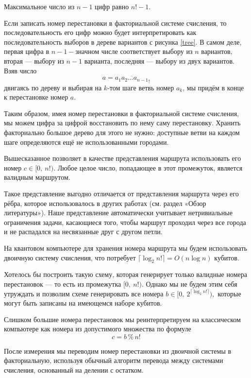 Максимальное число из $n-1$ цифр равно $n!-1$. 
 
Если записать номер перестановки в факториальной системе счисления, то последовательность его цифр можно будет интерпретировать как последовательность выборов в дереве вариантов с рисунка \ref{tree}. 
В самом деле, первая цифра в $n{-}1{-}$значном числе соответствует выбору из $n$ вариантов, вторая --- выбору из $n-1$ варианта, последняя --- выбору из двух вариантов. 
Взяв число 
$$a = \overline{a_1 a_2 \dots a_{n-1}}_!$$ 
двигаясь по дереву и выбирая на $k$-том шаге ветвь номер $a_k$, мы придём в конце к перестановке номер $a$.

Таким образом, имея номер перестановки в факториальной системе счисления, мы можем цифра за цифрой восстановить по нему саму перестановку. Хранить факториально большое дерево для этого не нужно: доступные ветви на каждом шаге определяются ещё не использованными городами.



Вышесказанное позволяет в качестве представления маршрута использовать его номер $c \in [0,\: n!)$. Любое целое число, попадающее в этот промежуток, является валидным маршрутом.

Такое представление выгодно отличается от представления маршрута через его рёбра, которое использовалось в других работах (см. раздел «Обзор литературы»). Наше представление автоматически учитывает нетривиальные ограничения задачи, касающиеся того, чтобы маршрут проходил через все города и не распадался на несвязанные друг с другом петли.

На квантовом компьютере для хранения номера маршрута мы будем использовать двоичную систему счисления, что потребует $\lceil \log_2 n! \rceil = O(n \log n)$ кубитов. 

Хотелось бы построить такую схему, которая генерирует только валидные номера перестановок --- то есть из промежутка $[0,\: n!)$. Однако мы не будем этим себя утруждать и позволим схеме генерировать все номера $b \in [0,\: 2^{\lceil \log_2 n! \rceil}),$ которые могут быть записаны на имеющемся наборе кубитов.

Слишком большие номера перестановок мы реинтерпретируем на классическом компьютере как номера из допустимого множества по формуле
$$c = b \mathbin{\%} n!$$

После измерения мы переводим номер перестановки из двоичной системы в факториальную, используя обычный алгоритм перевода между системами счисления, основанный на делении с остатком.

